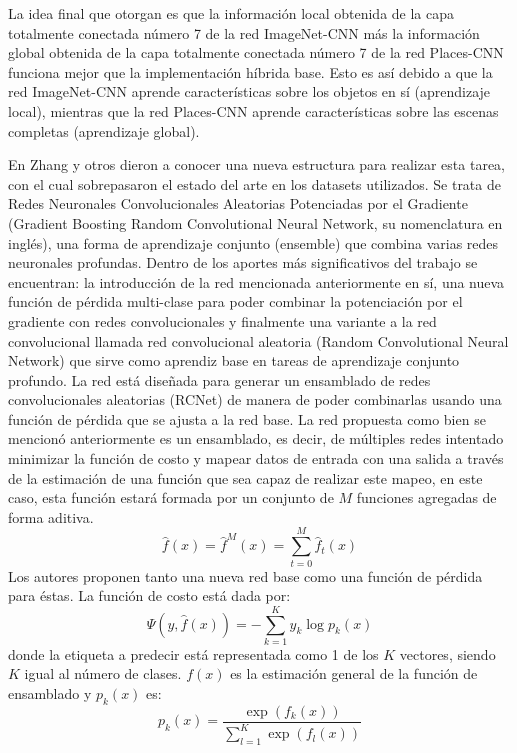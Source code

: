 La idea final que otorgan es que la información local obtenida de la capa totalmente conectada número 7 de la red ImageNet-CNN más la información global obtenida de la capa totalmente conectada número 7 de la red Places-CNN funciona mejor que la implementación híbrida base. Esto es así debido a que la red ImageNet-CNN aprende características sobre los objetos en sí (aprendizaje local), mientras que la red Places-CNN aprende características sobre las escenas completas (aprendizaje global).

En \cite{scene_classification_using_gbrcn} Zhang y otros dieron a conocer una nueva estructura para realizar esta tarea, con el cual sobrepasaron el estado del arte en los datasets utilizados. Se trata de Redes Neuronales Convolucionales Aleatorias Potenciadas por el Gradiente (Gradient Boosting Random Convolutional Neural Network, su nomenclatura en inglés), una forma de aprendizaje conjunto (ensemble) que combina varias redes neuronales profundas.
Dentro de los aportes más significativos del trabajo se encuentran: la introducción de la red mencionada anteriormente en sí, una nueva función de pérdida multi-clase para poder combinar la potenciación por el gradiente con redes convolucionales y finalmente una variante a la red convolucional llamada red convolucional aleatoria (Random Convolutional Neural Network) que sirve como aprendiz base en tareas de aprendizaje conjunto profundo.
La red está diseñada para generar un ensamblado de redes convolucionales aleatorias (RCNet) de manera de poder combinarlas usando una función de pérdida que se ajusta a la red base. La red propuesta como bien se mencionó anteriormente es un ensamblado, es decir, de múltiples redes intentado minimizar la función de costo y mapear datos de entrada con una salida a través de la estimación de una función que sea capaz de realizar este mapeo, en este caso, esta función estará formada por un conjunto de \(M\) funciones agregadas de forma aditiva. 
\begin{equation}
\hat{f}(x)=\hat{f}^{M}(x)=\sum_{t=0}^{M} \hat{f}_{t}(x)
\end{equation}
Los autores proponen tanto una nueva red base como una función de pérdida para éstas. La función de costo está dada por:
\begin{equation}
\Psi(y, \hat{f}(x))=-\sum_{k=1}^{K} y_{k} \log p_{k}(x)
\end{equation}
donde la etiqueta a predecir está representada como 1 de los \(K\) vectores, siendo \(K\) igual al número de clases. \(f(x)\) es la estimación general de la función de ensamblado y \(p_{k}(x)\) es:
\begin{equation}
p_{k}(x)=\frac{\exp \left(f_{k}(x)\right)}{\sum_{l=1}^{K} \exp \left(f_{l}(x)\right)}
\end{equation}

